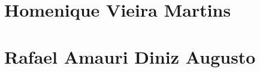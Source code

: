 \begin{apendicesenv}
      
    \partapendices
    \setcounter{chapter}{0}
    \renewcommand{\thechapter}{\Alph{chapter}}%

    \chapter{Homenique Vieira Martins}



    \newpage


       
    \newpage
    \chapter{Rafael Amauri Diniz Augusto}





    
    \newpage
    


\end{apendicesenv}